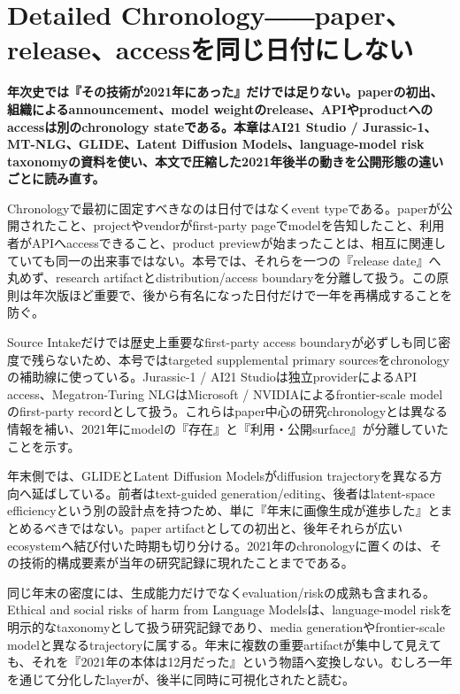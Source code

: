 \section{Detailed Chronology――paper、release、accessを同じ日付にしない}
\label{pkg:annual-chronology}
\noindent\textbf{年次史では『その技術が2021年にあった』だけでは足りない。paperの初出、組織によるannouncement、model weightのrelease、APIやproductへのaccessは別のchronology stateである。本章はAI21 Studio / Jurassic-1、MT-NLG、GLIDE、Latent Diffusion Models、language-model risk taxonomyの資料を使い、本文で圧縮した2021年後半の動きを公開形態の違いごとに読み直す。}\autocite{src-20fd9bba2e7a,src-50244427230b,src-a4561c635fe6,src-b307b4b82867,src-bf581c89a17f}

Chronologyで最初に固定すべきなのは日付ではなくevent typeである。paperが公開されたこと、projectやvendorがfirst-party pageでmodelを告知したこと、利用者がAPIへaccessできること、product previewが始まったことは、相互に関連していても同一の出来事ではない。本号では、それらを一つの『release date』へ丸めず、research artifactとdistribution/access boundaryを分離して扱う。この原則は年次版ほど重要で、後から有名になった日付だけで一年を再構成することを防ぐ。\autocite{src-50244427230b,src-b307b4b82867,src-bf581c89a17f}


Source Intakeだけでは歴史上重要なfirst-party access boundaryが必ずしも同じ密度で残らないため、本号ではtargeted supplemental primary sourcesをchronologyの補助線に使っている。Jurassic-1 / AI21 Studioは独立providerによるAPI access、Megatron-Turing NLGはMicrosoft / NVIDIAによるfrontier-scale modelのfirst-party recordとして扱う。これらはpaper中心の研究chronologyとは異なる情報を補い、2021年にmodelの『存在』と『利用・公開surface』が分離していたことを示す。\autocite{src-b307b4b82867,src-bf581c89a17f}


年末側では、GLIDEとLatent Diffusion Modelsがdiffusion trajectoryを異なる方向へ延ばしている。前者はtext-guided generation/editing、後者はlatent-space efficiencyという別の設計点を持つため、単に『年末に画像生成が進歩した』とまとめるべきではない。paper artifactとしての初出と、後年それらが広いecosystemへ結び付いた時期も切り分ける。2021年のchronologyに置くのは、その技術的構成要素が当年の研究記録に現れたことまでである。\autocite{src-50244427230b,src-a4561c635fe6}


同じ年末の密度には、生成能力だけでなくevaluation/riskの成熟も含まれる。Ethical and social risks of harm from Language Modelsは、language-model riskを明示的なtaxonomyとして扱う研究記録であり、media generationやfrontier-scale modelと異なるtrajectoryに属する。年末に複数の重要artifactが集中して見えても、それを『2021年の本体は12月だった』という物語へ変換しない。むしろ一年を通じて分化したlayerが、後半に同時に可視化されたと読む。\autocite{src-20fd9bba2e7a,src-50244427230b,src-a4561c635fe6}



